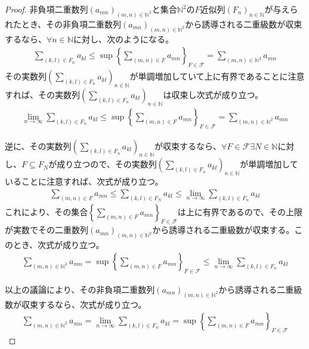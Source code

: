 \documentclass[dvipdfmx]{jsarticle}
\begin{document}
\begin{proof}
非負項二重数列$\left( a_{mn} \right)_{(m,n) \in \mathbb{N}^{2}}$と集合$\mathbb{N}^{2}$の$F$近似列$\left( F_{n} \right)_{n \in \mathbb{N}}$が与えられたとき、その非負項二重数列$\left( a_{mn} \right)_{(m,n) \in \mathbb{N}^{2}}$から誘導される二重級数が収束するなら、$\forall n \in \mathbb{N}$に対し、次のようになる。
\begin{align*}
\sum_{(k,l) \in F_{n}}a_{kl} \leq \sup\left\{ \sum_{(m,n) \in F}a_{mn} \right\}_{F \in \mathcal{F}} = \sum_{(m,n) \in \mathbb{N}^{2}}a_{mn}
\end{align*}
その実数列$\left( \sum_{(k,l) \in F_{n}}a_{kl} \right)_{n \in \mathbb{N}}$が単調増加していて上に有界であることに注意すれば、その実数列$\left( \sum_{(k,l) \in F_{n}}a_{kl} \right)_{n \in \mathbb{N}}$は収束し次式が成り立つ。
\begin{align*}
\lim_{n \rightarrow \infty}{\sum_{(k,l) \in F_{n}}a_{kl}} \leq \sup\left\{ \sum_{(m,n) \in F}a_{mn} \right\}_{F \in \mathcal{F}} = \sum_{(m,n) \in \mathbb{N}^{2}}a_{mn}
\end{align*}\par
逆に、その実数列$\left( \sum_{(k,l) \in F_{n}}a_{kl} \right)_{n \in \mathbb{N}}$が収束するなら、$\forall F \in \mathcal{F\exists}N \in \mathbb{N}$に対し、$F \subseteq F_{N}$が成り立つので、その実数列$\left( \sum_{(k,l) \in F_{n}}a_{kl} \right)_{n \in \mathbb{N}}$が単調増加していることに注意すれば、次式が成り立つ。
\begin{align*}
\sum_{(m,n) \in F}a_{mn} \leq \sum_{(k,l) \in F_{N}}a_{kl} \leq \lim_{n \rightarrow \infty}{\sum_{(k,l) \in F_{n}}a_{kl}}
\end{align*}
これにより、その集合$\left\{ \sum_{(m,n) \in F}a_{mn} \right\}_{F \in \mathcal{F}}$は上に有界であるので、その上限が実数でその二重数列$\left( a_{mn} \right)_{(m,n) \in \mathbb{N}^{2}}$から誘導される二重級数が収束する。このとき、次式が成り立つ。
\begin{align*}
\sum_{(m,n) \in \mathbb{N}^{2}}a_{mn} = \sup\left\{ \sum_{(m,n) \in F}a_{mn} \right\}_{F \in \mathcal{F}} \leq \lim_{n \rightarrow \infty}{\sum_{(k,l) \in F_{n}}a_{kl}}
\end{align*}\par
以上の議論により、その非負項二重数列$\left( a_{mn} \right)_{(m,n) \in \mathbb{N}^{2}}$から誘導される二重級数が収束するなら、次式が成り立つ。
\begin{align*}
\sum_{(m,n) \in \mathbb{N}^{2}}a_{mn} = \lim_{n \rightarrow \infty}{\sum_{(k,l) \in F_{n}}a_{kl}} = \sup\left\{ \sum_{(m,n) \in F}a_{mn} \right\}_{F\in \mathcal{F}}
\end{align*}
\end{proof}
\end{document}
